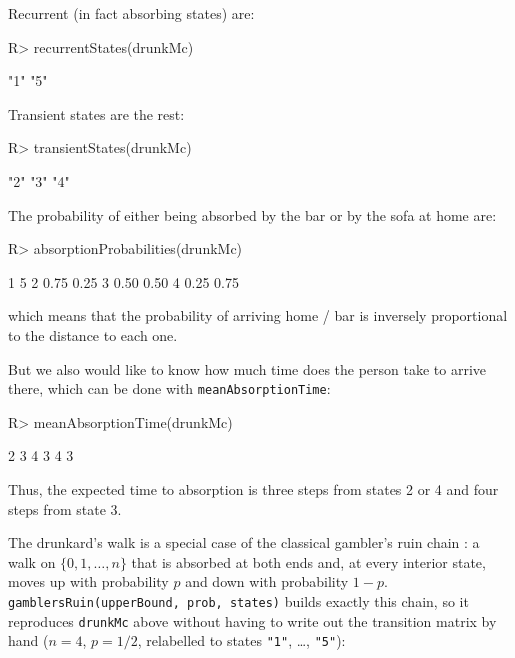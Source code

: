 \documentclass[
  nojss]{jss}
\begin{document}
Recurrent (in fact absorbing states) are:

\begin{CodeChunk}
\begin{CodeInput}
R> recurrentStates(drunkMc)
\end{CodeInput}
\begin{CodeOutput}
[1] "1" "5"
\end{CodeOutput}
\end{CodeChunk}

Transient states are the rest:

\begin{CodeChunk}
\begin{CodeInput}
R> transientStates(drunkMc)
\end{CodeInput}
\begin{CodeOutput}
[1] "2" "3" "4"
\end{CodeOutput}
\end{CodeChunk}

The probability of either being absorbed by the bar or by the sofa at home are:

\begin{CodeChunk}
\begin{CodeInput}
R> absorptionProbabilities(drunkMc)
\end{CodeInput}
\begin{CodeOutput}
     1    5
2 0.75 0.25
3 0.50 0.50
4 0.25 0.75
\end{CodeOutput}
\end{CodeChunk}

which means that the probability of arriving home / bar is inversely proportional to the distance to each one.

But we also would like to know how much time does the person take to arrive there, which can be done with \texttt{meanAbsorptionTime}:

\begin{CodeChunk}
\begin{CodeInput}
R> meanAbsorptionTime(drunkMc)
\end{CodeInput}
\begin{CodeOutput}
2 3 4 
3 4 3 
\end{CodeOutput}
\end{CodeChunk}

Thus, the expected time to absorption is three steps from states 2 or 4 and four steps from state 3.

The drunkard's walk is a special case of the classical gambler's ruin chain
\citep{GrinsteadSnell}: a walk on \(\{0,1,\ldots,n\}\) that is absorbed at
both ends and, at every interior state, moves up with probability \(p\) and
down with probability \(1-p\). \texttt{gamblersRuin(upperBound,\ prob,\ states)}
builds exactly this chain, so it reproduces \texttt{drunkMc} above without having
to write out the transition matrix by hand (\(n=4\), \(p=1/2\), relabelled to
states \texttt{"1"}, \ldots, \texttt{"5"}):
\end{document}
